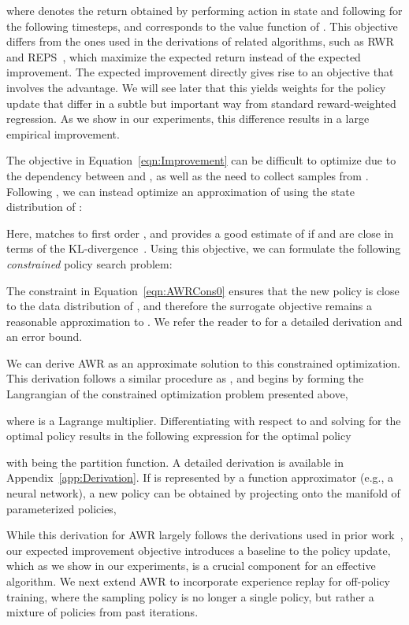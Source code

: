 \documentclass{article} \usepackage{iclr2020_conference,times}
\begin{document}
where  denotes the return obtained by performing action  in state  and following  for the following timesteps, and  corresponds to the value function of . 
This objective differs from the ones used in the derivations of related algorithms, such as RWR and REPS~\citep{Peters2007RWR,Peters2010REP,abdolmaleki2018maximum}, which maximize the expected return  instead of the expected improvement. The expected improvement directly gives rise to an objective that involves the advantage. We will see later that this yields weights for the policy update that differ in a subtle but important way from standard reward-weighted regression. As we show in our experiments, this difference results in a large empirical improvement.

The objective in Equation~\ref{eqn:Improvement} can be difficult to optimize due to the dependency between  and , as well as the need to collect samples from .
Following \citet{TRPOschulman15}, we can instead optimize an approximation  of  using the state distribution of :

Here,  matches  to first order \citep{Kakade2002}, and provides a good estimate of  if  and  are close in terms of the KL-divergence~\citep{TRPOschulman15}. Using this objective, we can formulate the following \emph{constrained} policy search problem:

The constraint in Equation~\ref{eqn:AWRCons0} ensures that the new policy  is close to the data distribution of , and therefore the surrogate objective   remains a reasonable approximation to . We refer the reader to \citet{TRPOschulman15} for a detailed derivation and an error bound.

We can derive AWR as an approximate solution to this constrained optimization. This derivation follows a similar procedure as \citet{Peters2010REP},
and begins by forming the Langrangian of the constrained optimization problem presented above,

where  is a Lagrange multiplier. Differentiating 
with respect to  and solving for the optimal policy  results in the following expression for the optimal policy

with  being the partition function. A detailed derivation is available in Appendix~\ref{app:Derivation}. If  is represented by a function approximator (e.g., a neural network), a new policy can be obtained by projecting  onto the manifold of parameterized policies,

While this derivation for AWR largely follows the derivations used in prior work~\citep{Peters2010REP,abdolmaleki2018maximum}, our expected improvement objective introduces a baseline  to the policy update, which as we show in our experiments, is a crucial component for an effective algorithm. We next extend AWR to incorporate experience replay for off-policy training, where the sampling policy is no longer a single policy, but rather a mixture of policies from past iterations.
\end{document}
